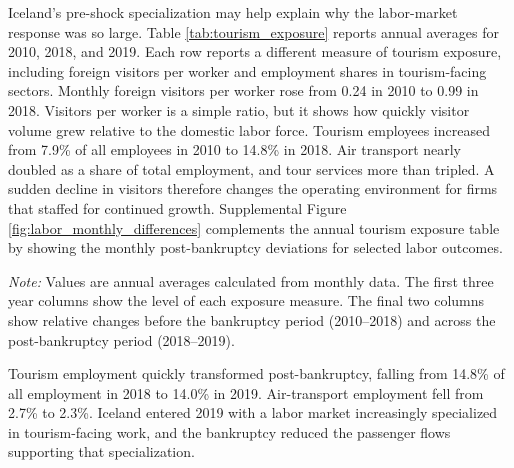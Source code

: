 \documentclass[12pt]{article}
\begin{document}
Iceland's pre-shock specialization may help explain why the labor-market response was so large. Table \ref{tab:tourism_exposure} reports annual averages for 2010, 2018, and 2019. Each row reports a different measure of tourism exposure, including foreign visitors per worker and employment shares in tourism-facing sectors. Monthly foreign visitors per worker rose from 0.24 in 2010 to 0.99 in 2018. Visitors per worker is a simple ratio, but it shows how quickly visitor volume grew relative to the domestic labor force. Tourism employees increased from 7.9\% of all employees in 2010 to 14.8\% in 2018. Air transport nearly doubled as a share of total employment, and tour services more than tripled. A sudden decline in visitors therefore changes the operating environment for firms that staffed for continued growth. Supplemental Figure \ref{fig:labor_monthly_differences} complements the annual tourism exposure table by showing the monthly post-bankruptcy deviations for selected labor outcomes.

\clearpage\begin{table}\centering\caption{Tourism Employment Concentration in 2010, 2018, and 2019}\label{tab:tourism_exposure}\resizebox{\textwidth}{!}{\centering}\par\vspace{0.35em}\noindent\begin{minipage}{0.95\linewidth}\raggedright\scriptsize \textit{Note:} Values are annual averages calculated from monthly data. The first three year columns show the level of each exposure measure. The final two columns show relative changes before the bankruptcy period (2010--2018) and across the post-bankruptcy period (2018--2019).\end{minipage}\end{table}\clearpage

Tourism employment quickly transformed post-bankruptcy, falling from 14.8\% of all employment in 2018 to 14.0\% in 2019. Air-transport employment fell from 2.7\% to 2.3\%. Iceland entered 2019 with a labor market increasingly specialized in tourism-facing work, and the bankruptcy reduced the passenger flows supporting that specialization.
\end{document}
